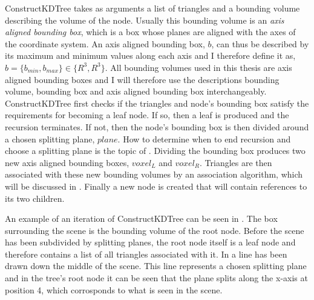 ConstructKDTree takes as arguments a list of triangles and a bounding volume
describing the volume of the node. Usually this bounding volume is an
\textit{axis aligned bounding box}, which is a box whose planes are aligned with
the axes of the coordinate system. An axis aligned bounding box, $b$, can thus
be described by its maximum and minimum values along each axis and I therefore
define it as, $b = \{b_{min}, b_{max}\} \in \{R^3, R^3\}$. All bounding volumes
used in this thesis are axis aligned bounding boxes and I will therefore use the
descriptions bounding volume, bounding box and axis aligned bounding box
interchangeably. ConstructKDTree first checks if the triangles and node's
bounding box satisfy the requirements for becoming a leaf node. If so, then a
leaf is produced and the recursion terminates. If not, then the node's bounding
box is then divided around a chosen splitting plane, $plane$. How to determine
when to end recursion and choose a splitting plane is the topic of
. Dividing the bounding box produces two new axis
aligned bounding boxes, $voxel_L$ and $voxel_R$. Triangles are then associated
with these new bounding volumes by an association algorithm, which will be
discussed in . Finally a new node is created
that will contain references to its two children.

An example of an iteration of ConstructKDTree can be seen in
. The box surrounding the scene is the bounding volume
of the root node. Before the scene has been subdivided by splitting planes, the
root node itself is a leaf node and therefore contains a list of all triangles
associated with it. In  a line has been drawn down the
middle of the scene. This line represents a chosen splitting plane and in the
tree's root node it can be seen that the plane splits along the x-axis at
position 4, which corrosponds to what is seen in the scene.

